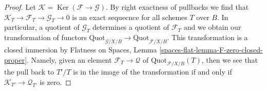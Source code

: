 \documentclass[10pt,a4paper]{amsart}
\theoremstyle{plain}
\theoremstyle{definition}
\theoremstyle{remark}
\numberwithin{equation}{subsection}
\def\Ker{\mathop{\mathrm{Ker}}}
\def\Quotfunctor{\mathrm{Quot}}
\begin{document}
\begin{proof}
Let $\mathcal{K} = \Ker(\mathcal{F} \to \mathcal{G})$. By right
exactness of pullbacks we find that
$\mathcal{K}_T \to \mathcal{F}_T \to \mathcal{G}_T \to 0$
is an exact sequecnce for all schemes $T$ over $B$.
In particular, a quotient of $\mathcal{G}_T$
determines a quotient of $\mathcal{F}_T$ and we obtain our transformation
of functors
$\Quotfunctor_{\mathcal{G}/X/B} \to \Quotfunctor_{\mathcal{F}/X/B}$.
This transformation is a closed immersion by
Flatness on Spaces, Lemma \ref{spaces-flat-lemma-F-zero-closed-proper}.
Namely, given an element $\mathcal{F}_T \to \mathcal{Q}$ of
$\Quotfunctor_{\mathcal{F}/X/B}(T)$, then we see that the pull
back to $T'/T$ is in the image of the transformation if and
only if $\mathcal{K}_{T'} \to \mathcal{Q}_{T'}$ is zero.
\end{proof}
\end{document}
